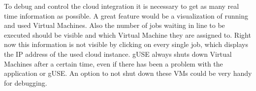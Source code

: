 To debug and control the cloud integration it is necessary to get as many real time information as possible.
A great feature would be a visualization of running and used Virtual Machines.
Also the number of jobs waiting in line to be executed should be visible and which Virtual Machine they are assigned to.
Right now this information is not visible by clicking on every single job, which displays the IP address of the used cloud instance.
gUSE always shuts down Virtual Machines after a certain time, even if there has been a problem with the application or gUSE.
An option to not shut down these VMs could be very handy for debugging.